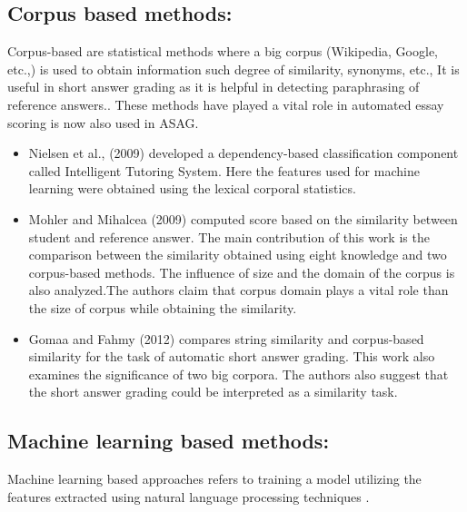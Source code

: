 \subsection{Corpus based methods:}

Corpus-based are statistical methods where a big corpus (Wikipedia, Google, etc.,) is used to obtain information such degree of similarity, synonyms, etc., It is useful in short answer grading as it is helpful in detecting paraphrasing of reference answers.\cite{Burrows2015}. These methods have played a vital role in automated essay scoring is now also used in ASAG.

\begin{itemize}
	
	\item Nielsen et al., (2009) \cite{Nielsen2009} developed a dependency-based classification component called Intelligent Tutoring System. Here the features used for machine learning were obtained using the lexical corporal statistics. 
	
	
	
	\item Mohler and Mihalcea (2009) \cite{Mohler2009}
	computed score based on the similarity between student and reference answer. The main contribution of this work is the comparison between the similarity obtained using eight knowledge and two corpus-based methods. The influence of size and the domain of the corpus is also analyzed.The authors claim that corpus domain plays a vital role than the size of corpus while obtaining the similarity.
	
	
	\item Gomaa and Fahmy (2012) \cite{Gomaa2012} compares string similarity and corpus-based similarity for the task of automatic short answer grading. This work also examines the significance of two big corpora. The authors also suggest that the short answer grading could be interpreted as a similarity task.
	
	
\end{itemize}


\subsection{Machine learning based methods:}

Machine learning based approaches refers to training a model utilizing the features extracted using  natural language processing techniques \cite{Burrows2015}.

